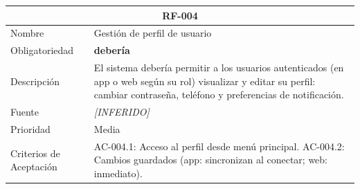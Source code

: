 \documentclass[12pt, a4paper]{article}
\newcommand{\inferido}{\textcolor{medio}{\textit{[INFERIDO]}}}
\begin{document}
\begin{longtable}{|p{3cm}|p{11.5cm}|}
\hline
\multicolumn{2}{|c|}{\textbf{RF-004}} \\
\hline
Nombre & Gesti\'on de perfil de usuario \\
\hline
Obligatoriedad & \textbf{deber\'ia} \\
\hline
Descripci\'on & El sistema deber\'ia permitir a los usuarios autenticados (en app o web seg\'un su rol) visualizar y editar su perfil: cambiar contrase\~na, tel\'efono y preferencias de notificaci\'on. \\
\hline
Fuente & \inferido{} \\
\hline
Prioridad & Media \\
\hline
Criterios de Aceptaci\'on &
AC-004.1: Acceso al perfil desde men\'u principal. \newline
AC-004.2: Cambios guardados (app: sincronizan al conectar; web: inmediato). \\
\hline
\end{longtable}
\end{document}
